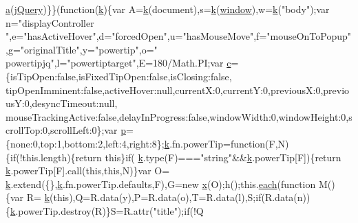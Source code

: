 \begin{DoxyCode}
      \hyperlink{jquery_8js_aa4d4888597588a84fd5b1184d00c91f3}{a}(\hyperlink{jquery_8js_aa676d9980e4aff2d9210b4c8e0e1dad9}{jQuery})\}\}(\textcolor{keyword}{function}(\hyperlink{jquery_8js_ab26645c014aa005ecedef329ecf58c99}{k})\{var A=\hyperlink{jquery_8js_ab26645c014aa005ecedef329ecf58c99}{k}(document),s=\hyperlink{jquery_8js_ab26645c014aa005ecedef329ecf58c99}{k}(\hyperlink{jquery_8js_a04a8a2bbfa9c15500892b8e5033d625b}{window}),w=\hyperlink{jquery_8js_ab26645c014aa005ecedef329ecf58c99}{k}(\textcolor{stringliteral}{"body"});var n=\textcolor{stringliteral}{"displayController
      "},e=\textcolor{stringliteral}{"hasActiveHover"},d=\textcolor{stringliteral}{"forcedOpen"},u=\textcolor{stringliteral}{"hasMouseMove"},f=\textcolor{stringliteral}{"mouseOnToPopup"},g=\textcolor{stringliteral}{"originalTitle"},y=\textcolor{stringliteral}{"powertip"},o=\textcolor{stringliteral}{"
      powertipjq"},l=\textcolor{stringliteral}{"powertiptarget"},E=180/Math.PI;var \hyperlink{jquery_8js_abce695e0af988ece0826d9ad59b8160d}{c}=\{isTipOpen:\textcolor{keyword}{false},isFixedTipOpen:\textcolor{keyword}{false},isClosing:\textcolor{keyword}{false},
      tipOpenImminent:\textcolor{keyword}{false},activeHover:null,currentX:0,currentY:0,previousX:0,previousY:0,desyncTimeout:null,
      mouseTrackingActive:\textcolor{keyword}{false},delayInProgress:\textcolor{keyword}{false},windowWidth:0,windowHeight:0,scrollTop:0,scrollLeft:0\};var 
      \hyperlink{jquery_8js_a2335e57f79b6acfb6de59c235dc8a83e}{p}=\{none:0,top:1,bottom:2,left:4,right:8\};\hyperlink{jquery_8js_ab26645c014aa005ecedef329ecf58c99}{k}.fn.powerTip=\textcolor{keyword}{function}(F,N)\{\textcolor{keywordflow}{if}(!this.length)\{\textcolor{keywordflow}{return} \textcolor{keyword}{this}\}\textcolor{keywordflow}{if}(
      \hyperlink{jquery_8js_ab26645c014aa005ecedef329ecf58c99}{k}.type(F)===\textcolor{stringliteral}{"string"}&&\hyperlink{jquery_8js_ab26645c014aa005ecedef329ecf58c99}{k}.powerTip[F])\{\textcolor{keywordflow}{return} \hyperlink{jquery_8js_ab26645c014aa005ecedef329ecf58c99}{k}.powerTip[F].call(\textcolor{keyword}{this},\textcolor{keyword}{this},N)\}var O=
      \hyperlink{jquery_8js_ab26645c014aa005ecedef329ecf58c99}{k}.extend(\{\},\hyperlink{jquery_8js_ab26645c014aa005ecedef329ecf58c99}{k}.fn.powerTip.defaults,F),G=\textcolor{keyword}{new} \hyperlink{jquery_8js_a4c3eadaa5164016d2c340d495fc6e55e}{x}(O);h();this.\hyperlink{jquery_8js_a871ff39db627c54c710a3e9909b8234c}{each}(\textcolor{keyword}{function} M()\{var R=
      \hyperlink{jquery_8js_ab26645c014aa005ecedef329ecf58c99}{k}(\textcolor{keyword}{this}),Q=R.data(y),P=R.data(o),T=R.data(l),S;\textcolor{keywordflow}{if}(R.data(n))\{\hyperlink{jquery_8js_ab26645c014aa005ecedef329ecf58c99}{k}.powerTip.destroy(R)\}S=R.attr(\textcolor{stringliteral}{"title"});\textcolor{keywordflow}{if}(!Q

\end{DoxyCode}
